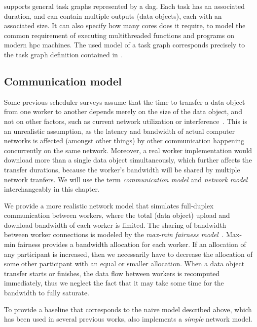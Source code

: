 \estee{} supports general task graphs represented by a \gls{dag}.
Each task has an associated duration, and can contain multiple outputs (data objects), each with an
associated size. It can also specify how many cores does it require, to model the common
requirement of executing multithreaded functions and programs on modern \gls{hpc}
machines. The used model of a task graph corresponds precisely to the task graph definition
contained in .

\subsection{Communication model}
Some previous scheduler surveys assume that the time to transfer a data object from one worker to
another depends merely on the size of the data object, and not on other factors, such as current
network utilization or interference~\cite{tang2010list,yao2013task,wang2018list,kwok1996dynamic}. This is an unrealistic assumption, as
the latency and bandwidth of actual computer networks is affected (amongst other things) by other
communication happening concurrently on the same network. Moreover, a real worker implementation
would download more than a single data object simultaneously, which further affects the transfer
durations, because the worker's bandwidth will be shared by multiple network tranfers. We will use
the term \emph{communication model} and \emph{network model} interchangeably in this chapter.

We provide a more realistic network model that simulates full-duplex communication between workers,
where the total (data object) upload and download bandwidth of each worker is limited. The sharing
of bandwidth between worker connections is modeled by the
\emph{max-min fairness model}~\cite{bertsekas_1992}. Max-min fairness provides a bandwidth allocation
for each worker. If an allocation of any participant is increased, then we necessarily have to
decrease the allocation of some other participant with an equal or smaller allocation. When a data
object transfer starts or finishes, the data flow between workers is recomputed immediately, thus
we neglect the fact that it may take some time for the bandwidth to fully saturate.


To provide a baseline that corresponds to the naive model described above, which has been used in
several previous works, \estee{} also implements a \emph{simple} network
model.

